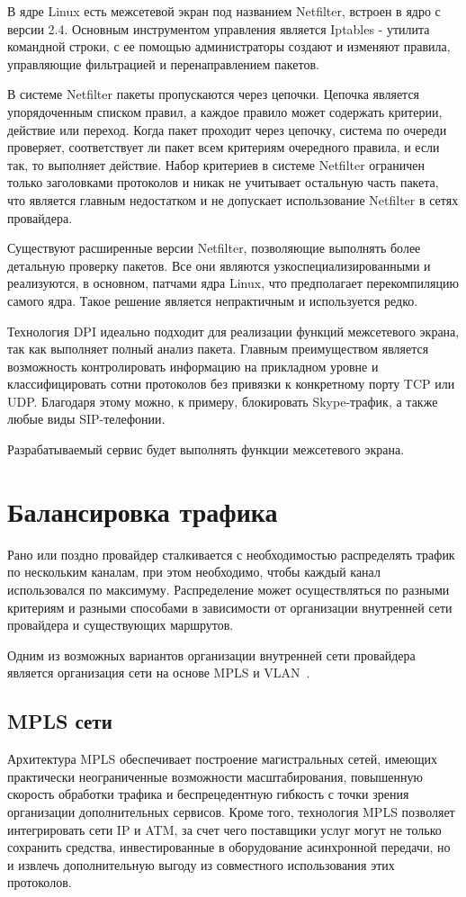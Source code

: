 В ядре Linux есть межсетевой экран под названием Netfilter, встроен в ядро с версии 2.4. Основным инструментом управления является Iptables - утилита командной строки, с ее помощью администраторы создают и изменяют правила, управляющие фильтрацией и перенаправлением пакетов.

В системе Netfilter пакеты пропускаются через цепочки. Цепочка является упорядоченным списком правил, а каждое правило может содержать критерии, действие или переход. Когда пакет проходит через цепочку, система по очереди проверяет, соответствует ли пакет всем критериям очередного правила, и если так, то выполняет действие. Набор критериев в системе Netfilter ограничен только заголовками протоколов и никак не учитывает остальную часть пакета, что является главным недостатком и не допускает использование Netfilter в сетях провайдера.

Существуют расширенные версии Netfilter, позволяющие выполнять более детальную проверку пакетов. Все они являются узкоспециализированными и реализуются, в основном, патчами ядра Linux, что предполагает перекомпиляцию самого ядра. Такое решение является непрактичным и используется редко.

Технология DPI идеально подходит для реализации функций межсетевого экрана, так как выполняет полный анализ пакета. Главным преимуществом является возможность контролировать информацию на прикладном уровне и классифицировать сотни протоколов без привязки к конкретному порту TCP или UDP. Благодаря этому можно, к примеру, блокировать Skype-трафик, а также любые виды SIP-телефонии.

Разрабатываемый сервис будет выполнять функции межсетевого экрана.


\section{Балансировка трафика}
Рано или поздно провайдер сталкивается с необходимостью распределять трафик по нескольким каналам, при этом необходимо, чтобы каждый канал использовался по максимуму. Распределение может осуществляться по разными критериям и разными способами в зависимости от организации внутренней сети провайдера и существующих маршрутов.

Одним из возможных вариантов организации внутренней сети провайдера является организация сети на основе MPLS и VLAN~\cite{modern_net}.

\subsection{MPLS сети}
Архитектура MPLS обеспечивает построение магистральных сетей, имеющих практически неограниченные возможности масштабирования, повышенную скорость обработки трафика и беспрецедентную гибкость с точки зрения организации дополнительных сервисов. Кроме того, технология MPLS позволяет интегрировать сети IP и ATM, за счет чего поставщики услуг могут не только сохранить средства, инвестированные в оборудование асинхронной передачи, но и извлечь дополнительную выгоду из совместного использования этих протоколов.

